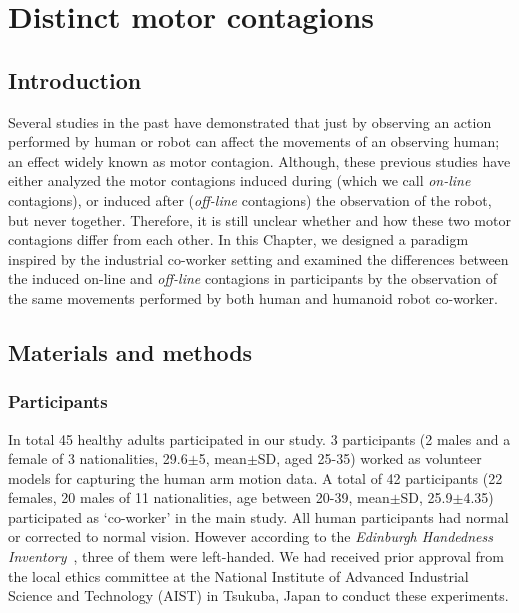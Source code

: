
{\color{blue}\chapter{Distinct motor contagions}\label{distinct motor contagion}}

\section{Introduction}

Several studies in the past have demonstrated that just by observing an action performed by human or robot can affect the movements of an observing human; an effect widely known as motor contagion. Although, these previous studies have either analyzed the motor contagions induced during (which we call \emph{on-line} contagions), or induced after (\emph{off-line} contagions) the observation of the robot, but never together. Therefore, it is still unclear whether and how these two motor contagions differ from each other. In this Chapter, we designed a paradigm inspired by the industrial co-worker setting and examined the differences between the induced on-line and \textit{off-line} contagions in participants by the observation of the same movements performed by both human and humanoid robot co-worker.



\section{Materials and methods}\label{roman method}

\subsection{Participants}

In total 45 healthy adults participated in our study. 3 participants (2 males and a female of 3 nationalities, 29.6$\pm$5, mean$\pm$SD, aged 25-35) worked as volunteer models for capturing the human arm motion data. A total of 42 participants (22 females, 20 males of 11 nationalities, age between 20-39, mean$\pm$SD, 25.9$\pm$4.35) participated as `co-worker' in the main study. All human participants had normal or corrected to normal vision. However according to the {\it Edinburgh Handedness Inventory}~\cite{robinson2013edinburgh}, three of them were left-handed. We had received prior approval from the local ethics committee at the National Institute of Advanced Industrial Science and Technology (AIST) in Tsukuba, Japan to conduct these experiments.

